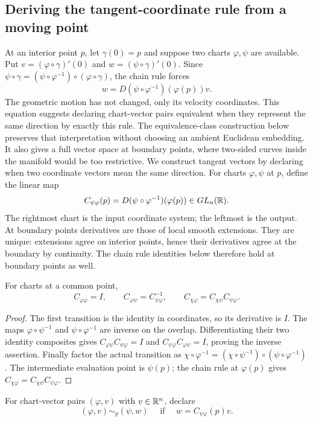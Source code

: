\subsection{Deriving the tangent-coordinate rule from a moving point}
At an interior point $p$, let $\gamma(0)=p$ and suppose two charts
$\varphi,\psi$ are available. Put
$v=(\varphi\circ\gamma)'(0)$ and $w=(\psi\circ\gamma)'(0)$.
Since $\psi\circ\gamma=(\psi\circ\varphi^{-1})\circ
(\varphi\circ\gamma)$, the chain rule forces
\[
w=D(\psi\circ\varphi^{-1})(\varphi(p))v.
\]
The geometric motion has not changed, only its velocity coordinates.
This equation suggests declaring chart-vector pairs equivalent when they
represent the same direction by exactly this rule. The equivalence-class
construction below preserves that interpretation without choosing an ambient
Euclidean embedding. It also gives a full vector space at boundary points,
where two-sided curves inside the manifold would be too restrictive.
We construct tangent vectors by declaring when two coordinate vectors mean
the same direction. For charts $\varphi,\psi$ at $p$, define the linear map
\[
C_{\psi\varphi}(p)=D(\psi\circ\varphi^{-1})(\varphi(p))\in GL_n(\mathbb{R}).
\]
The rightmost chart is the input coordinate system; the leftmost is the output.
At boundary points derivatives are those of local smooth extensions. They
are unique: extensions agree on interior points, hence their derivatives
agree at the boundary by continuity. The chain rule identities below
therefore hold at boundary points as well.
\begin{lemma}\label{lem:tangent-transitions}
For charts at a common point,
\[
C_{\varphi\varphi}=I,\qquad
C_{\varphi\psi}=C_{\psi\varphi}^{-1},\qquad
C_{\chi\varphi}=C_{\chi\psi}C_{\psi\varphi}.
\]
\end{lemma}
\begin{proof}
The first transition is the identity in coordinates, so its derivative is
$I$. The maps $\varphi\circ\psi^{-1}$ and $\psi\circ\varphi^{-1}$ are
inverse on the overlap. Differentiating their two identity composites gives
$C_{\varphi\psi}C_{\psi\varphi}=I$ and
$C_{\psi\varphi}C_{\varphi\psi}=I$, proving the inverse assertion.
Finally factor the actual transition as
$\chi\circ\varphi^{-1}=(\chi\circ\psi^{-1})\circ(\psi\circ\varphi^{-1})$.
The intermediate evaluation point is $\psi(p)$; the chain rule at
$\varphi(p)$ gives $C_{\chi\varphi}=C_{\chi\psi}C_{\psi\varphi}$.
\end{proof}
\begin{definition}
For chart-vector pairs $(\varphi,v)$ with $v\in\mathbb{R}^n$, declare
\[
(\varphi,v)\sim_p(\psi,w)\quad\text{ if }\quad
w=C_{\psi\varphi}(p)v.
\]
\end{definition}
